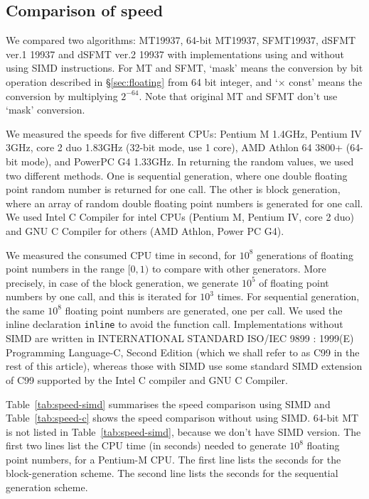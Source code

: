 \documentclass{svmult}
\begin{document}
\subsection{Comparison of speed}\label{sec:comp-speed}
We compared two algorithms: MT19937, 64-bit MT19937, SFMT19937, dSFMT
ver.1 19937 and dSFMT ver.2 19937 with implementations using and
without using SIMD instructions. For MT and SFMT, `mask' means the
conversion by bit operation described in \S\ref{sec:floating} from 64
bit integer, %
and `$\times$ const' means the
conversion by multiplying $2^{-64}$. Note that original MT and SFMT
don't use `mask' conversion.

We measured the speeds for five different CPUs: Pentium M 1.4GHz,
Pentium IV 3GHz, core 2 duo 1.83GHz (32-bit mode, use 1 core), AMD
Athlon 64 3800+ (64-bit mode), and PowerPC G4 1.33GHz.  In returning
the random values, we used two different methods.  One is sequential
generation, where one double floating point random number is returned
for one call.  The other is block generation, where an array of random
double floating point numbers is generated for one call.  We used
Intel C Compiler for intel CPUs (Pentium M, Pentium IV, core 2 duo)
and GNU C Compiler for others (AMD Athlon, Power PC G4).

We measured the consumed CPU time in second, for $10^8$ generations of
floating point numbers in the range $[0, 1)$ to compare with other
generators.  More precisely, in case of the block generation, we
generate $10^5$ of floating point numbers by one call, and this is
iterated for $10^3$ times.  For sequential generation, the same $10^8$
floating point numbers are generated, one per call.  We used
the inline declaration {\tt inline} to avoid the function call.
Implementations without SIMD are written in INTERNATIONAL STANDARD
ISO/IEC 9899 : 1999(E) Programming Language-C, Second Edition (which
we shall refer to as C99 in the rest of this article), whereas those
with SIMD use some standard SIMD extension of C99 supported by the
Intel C compiler and GNU C Compiler.

Table~\ref{tab:speed-simd} summarises the speed comparison using SIMD
and Table~\ref{tab:speed-c} shows the speed comparison without using
SIMD.  64-bit MT is not listed in Table~\ref{tab:speed-simd}, because
we don't have SIMD version.  The first two lines list the CPU time (in
seconds) needed to generate $10^8$ floating point numbers, for a
Pentium-M CPU.  The first line lists the seconds for the
block-generation scheme.  The second line lists the seconds for the
sequential generation scheme. 
\end{document}
